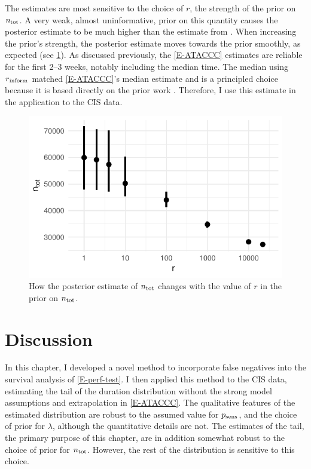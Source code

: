 \documentclass[thesis.tex]{subfiles}
\begin{document}
The estimates are most sensitive to the choice of $r$, the strength of the prior on $\ntot$.
A very weak, almost uninformative, prior on this quantity causes the posterior estimate to be much higher than the estimate from \textcite{birrellRTM2}.
When increasing the prior's strength, the posterior estimate moves towards the prior smoothly, as expected (see \cref{imperf-test:fig:ntot}).
As discussed previously, the \cref{E-ATACCC} estimates are reliable for the first 2--3 weeks, notably including the median time.
The median using $r{_{\text{inform}}}$ matched \cref{E-ATACCC}'s median estimate and is a principled choice because it is based directly on the prior work \textcite{birrellRTM2}.
Therefore, I use this estimate in the application to the CIS data.
\begin{figure}
  \centering \includegraphics{cis-imperfect-testing/CIS_ntot}
  \caption[Sensitivity of estimates of $\ntot$ to the prior.]{How the posterior estimate of $\ntot$ changes with the value of $r$ in the prior on $\ntot$.}
  \label{imperf-test:fig:ntot}
\end{figure}

\section{Discussion} \label{imperf-test:sec:discussion}

In this chapter, I developed a novel method to incorporate false negatives into the survival analysis of \cref{E-perf-test}.
I then applied this method to the CIS data, estimating the tail of the duration distribution without the strong model assumptions and extrapolation in \cref{E-ATACCC}.
The qualitative features of the estimated distribution are robust to the assumed value for $p_\text{sens}$, and the choice of prior for $\lambda$, although the quantitative details are not.
The estimates of the tail, the primary purpose of this chapter, are in addition somewhat robust to the choice of prior for $\ntot$.
However, the rest of the distribution is sensitive to this choice.
\end{document}
